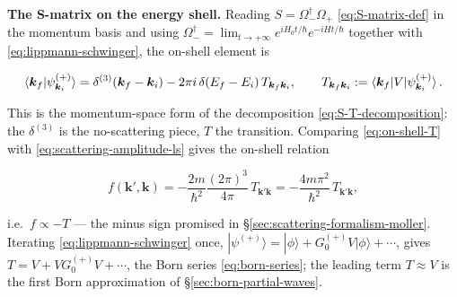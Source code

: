\medskip\noindent\textbf{The S-matrix on the energy shell.}
Reading $S=\Omega_{-}^{\dagger}\Omega_{+}$ \eqref{eq:S-matrix-def} in the momentum basis and using $\Omega_{-}^{\dagger}=\lim_{t\to+\infty}e^{iH_{0}t/\hbar}e^{-iHt/\hbar}$ together with \eqref{eq:lippmann-schwinger}, the on-shell element is
\begin{linenomath}
\begin{equation}
\braket{\bm k_{f}|\psi_{\bm k_{i}}^{(+)}}=\delta^{(3)}(\bm k_{f}-\bm k_{i})-2\pi i\,\delta(E_{f}-E_{i})\,T_{\bm k_{f}\bm k_{i}},
\qquad
T_{\bm k_{f}\bm k_{i}}:=\braket{\bm k_{f}|V|\psi_{\bm k_{i}}^{(+)}}.
\label{eq:on-shell-T}
\end{equation}
\end{linenomath}
This is the momentum-space form of the decomposition \eqref{eq:S-T-decomposition}: the $\delta^{(3)}$ is the no-scattering piece, $T$ the transition. Comparing \eqref{eq:on-shell-T} with \eqref{eq:scattering-amplitude-ls} gives the on-shell relation
\begin{linenomath}
\begin{equation}
f(\bm k',\bm k)=-\frac{2m}{\hbar^{2}}\frac{(2\pi)^{3}}{4\pi}\,T_{\bm k'\bm k}=-\frac{4m\pi^{2}}{\hbar^{2}}\,T_{\bm k'\bm k},
\label{eq:f-T-relation}
\end{equation}
\end{linenomath}
i.e.\ $f\propto -T$ --- the minus sign promised in \S\ref{sec:scattering-formalism-moller}. Iterating \eqref{eq:lippmann-schwinger} once, $|\psi^{(+)}\rangle=|\phi\rangle+G_{0}^{(+)}V|\phi\rangle+\cdots$, gives $T=V+VG_{0}^{(+)}V+\cdots$, the Born series \eqref{eq:born-series}; the leading term $T\approx V$ is the first Born approximation of \S\ref{sec:born-partial-waves}.

